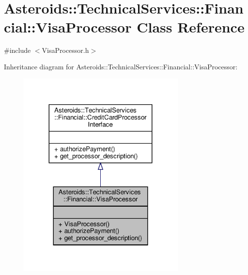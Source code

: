 \hypertarget{classAsteroids_1_1TechnicalServices_1_1Financial_1_1VisaProcessor}{}\section{Asteroids\+:\+:Technical\+Services\+:\+:Financial\+:\+:Visa\+Processor Class Reference}
\label{classAsteroids_1_1TechnicalServices_1_1Financial_1_1VisaProcessor}


{\ttfamily \#include $<$Visa\+Processor.\+h$>$}



Inheritance diagram for Asteroids\+:\+:Technical\+Services\+:\+:Financial\+:\+:Visa\+Processor\+:\nopagebreak
\begin{figure}[H]
\begin{center}
\leavevmode
\includegraphics[width=239pt]{classAsteroids_1_1TechnicalServices_1_1Financial_1_1VisaProcessor__inherit__graph}
\end{center}
\end{figure}


